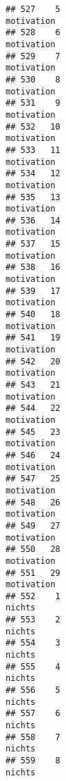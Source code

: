 \documentclass[
]{article}
\begin{document}
\begin{verbatim}
## 527    5                                                          motivation
## 528    6                                                          motivation
## 529    7                                                          motivation
## 530    8                                                          motivation
## 531    9                                                          motivation
## 532   10                                                          motivation
## 533   11                                                          motivation
## 534   12                                                          motivation
## 535   13                                                          motivation
## 536   14                                                          motivation
## 537   15                                                          motivation
## 538   16                                                          motivation
## 539   17                                                          motivation
## 540   18                                                          motivation
## 541   19                                                          motivation
## 542   20                                                          motivation
## 543   21                                                          motivation
## 544   22                                                          motivation
## 545   23                                                          motivation
## 546   24                                                          motivation
## 547   25                                                          motivation
## 548   26                                                          motivation
## 549   27                                                          motivation
## 550   28                                                          motivation
## 551   29                                                          motivation
## 552    1                                                              nichts
## 553    2                                                              nichts
## 554    3                                                              nichts
## 555    4                                                              nichts
## 556    5                                                              nichts
## 557    6                                                              nichts
## 558    7                                                              nichts
## 559    8                                                              nichts

\end{verbatim}
\end{document}
